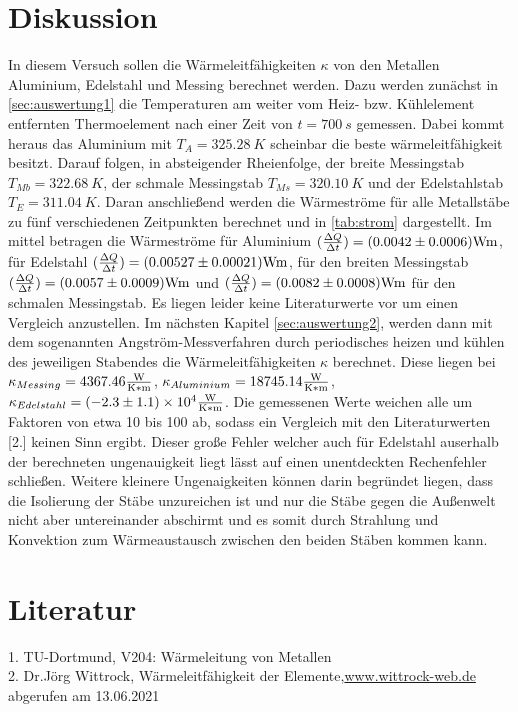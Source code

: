 \section{Diskussion}
In diesem Versuch sollen die Wärmeleitfähigkeiten $\kappa$ von den Metallen Aluminium, Edelstahl und Messing
berechnet werden. Dazu werden zunächst in \autoref{sec:auswertung1} die Temperaturen am weiter vom Heiz- bzw.
Kühlelement entfernten Thermoelement  nach einer Zeit von $t=\SI[]{700}[]{s}$ gemessen. Dabei kommt heraus das 
Aluminium mit $T_A=\SI[]{325.28}[]{K}$ scheinbar die beste wärmeleitfähigkeit besitzt. Darauf folgen, in absteigender
Rheienfolge, der breite Messingstab $T_{Mb}=\SI[]{322.68}[]{K}$, der schmale Messingstab $T_{Ms}=\SI[]{320.10}[]{K}$
und der Edelstahlstab $T_E=\SI[]{311.04}[]{K}$. Daran anschließend werden die Wärmeströme für alle Metallstäbe zu fünf
verschiedenen Zeitpunkten berechnet und in \autoref{tab:strom} dargestellt. Im mittel betragen die Wärmeströme für Aluminium
$(\frac{\Delta Q}{\Delta t})=(0.0042\pm 0.0006)\si[]{Wm}$, für Edelstahl $(\frac{\Delta Q}{\Delta t})=(0.00527\pm 0.00021)\si[]{Wm}$, 
für den breiten Messingstab$(\frac{\Delta Q}{\Delta t})=(0.0057\pm 0.0009)\si[]{Wm}$ und $(\frac{\Delta Q}{\Delta t})=(0.0082\pm 0.0008)\si[]{Wm}$
für den schmalen Messingstab. Es liegen leider keine Literaturwerte vor um einen Vergleich anzustellen. Im nächsten 
Kapitel \autoref{sec:auswertung2}, werden dann mit dem sogenannten Angström-Messverfahren durch periodisches heizen 
und kühlen des jeweiligen Stabendes die Wärmeleitfähigkeiten $\kappa$ berechnet. Diese liegen bei $\kappa_{Messing}=4367.46\si[]{\frac{W}{K*m}}$,
$\kappa_{Aluminium}=18745.14\si[]{\frac{W}{K*m}}$,  $\kappa_{Edelstahl}=(-2.3\pm 1.1)\times 10^{4}\si[]{\frac{W}{K*m}}$. 
Die gemessenen Werte weichen alle um Faktoren von etwa 10 bis 100 ab, sodass ein Vergleich mit den Literaturwerten 
[2.] keinen Sinn ergibt. Dieser  große Fehler welcher auch für Edelstahl auserhalb der berechneten ungenauigkeit 
liegt lässt auf einen unentdeckten Rechenfehler schließen. Weitere kleinere Ungenaigkeiten können darin begründet 
liegen, dass die Isolierung der Stäbe unzureichen ist und nur die Stäbe gegen die Außenwelt nicht aber untereinander
abschirmt und es somit durch Strahlung und Konvektion zum Wärmeaustausch zwischen den beiden Stäben kommen kann.

\section{Literatur}
1. TU-Dortmund, V204: Wärmeleitung von Metallen\\
2. Dr.Jörg Wittrock, Wärmeleitfähigkeit der Elemente,\hyperlink{http://www.wittrock-web.de/pse_leit_th.html}{www.wittrock-web.de} abgerufen am 13.06.2021
